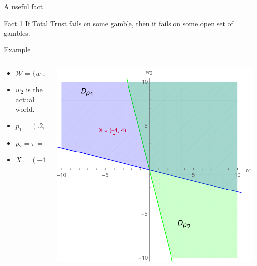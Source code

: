 \documentclass[aspectratio=169, dvipsnames]{beamer}
\newcommand{\W}{\mathcal{W}}
\begin{document}
\begin{frame}{A useful fact}
  \begin{block}{Fact 1}
    If Total Trust fails on some gamble, then it fails on some open set of gambles.
  \end{block}
\end{frame}

\begin{frame}{Example}
  \begin{columns}
    \begin{column}{.38\linewidth}
      \begin{itemize}
      \item $\W = \{w_1,w_2\}$
      \item $w_2$ is the actual world.
      \item $p_1 = (.2, .8)$
      \item $p_2 = \pi = (.8, .2)$
      \item $X = (-4, 4)$
      \end{itemize}
    \end{column}
    \begin{column}{.6\linewidth}
      \begin{center}
        \includegraphics[width=.92\textwidth]{TTFailure1.pdf}
      \end{center}
    \end{column}
  \end{columns}
\end{frame}
\end{document}

